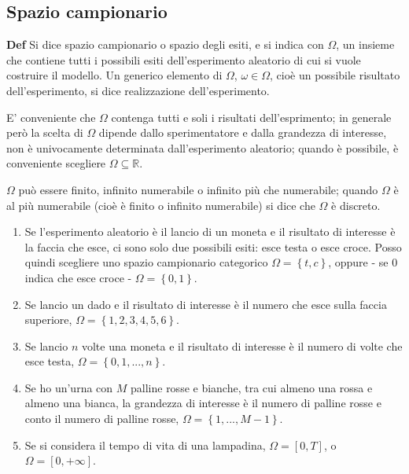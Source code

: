 \documentclass{article}
\begin{document}
\subsection{Spazio campionario}

\textbf{Def} Si dice spazio campionario o spazio degli esiti, e si indica
con $\Omega $, un insieme che contiene tutti i possibili esiti
dell'esperimento aleatorio di cui si vuole costruire il modello. Un generico
elemento di $\Omega $, $\omega \in \Omega $, cio\`{e} un possibile risultato
dell'esperimento, si dice realizzazione dell'esperimento.

E' conveniente che $\Omega $ contenga tutti e soli i risultati
dell'esprimento; in generale per\`{o} la scelta di $\Omega $ dipende dallo
sperimentatore e dalla grandezza di interesse, non \`{e} univocamente
determinata dall'esperimento aleatorio; quando \`{e} possibile, \`{e}
conveniente scegliere $\Omega \subseteq 
\mathbb{R}
$.

$\Omega $ pu\`{o} essere finito, infinito numerabile o infinito pi\`{u} che
numerabile; quando $\Omega $ \`{e} al pi\`{u} numerabile (cio\`{e} \`{e}
finito o infinito numerabile) si dice che $\Omega $ \`{e} discreto.

\begin{enumerate}
\item Se l'esperimento aleatorio \`{e} il lancio di un moneta e il risultato
di interesse \`{e} la faccia che esce, ci sono solo due possibili esiti:
esce testa o esce croce. Posso quindi scegliere uno spazio campionario
categorico $\Omega =\left\{ t,c\right\} $, oppure - se $0$ indica che esce
croce - $\Omega =\left\{ 0,1\right\} $.

\item Se lancio un dado e il risultato di interesse \`{e} il numero che esce
sulla faccia superiore, $\Omega =\left\{ 1,2,3,4,5,6\right\} $.

\item Se lancio $n$ volte una moneta e il risultato di interesse \`{e} il
numero di volte che esce testa, $\Omega =\left\{ 0,1,...,n\right\} $.

\item Se ho un'urna con $M$ palline rosse e bianche, tra cui almeno una
rossa e almeno una bianca, la grandezza di interesse \`{e} il numero di
palline rosse e conto il numero di palline rosse, $\Omega =\left\{
1,...,M-1\right\} $.

\item Se si considera il tempo di vita di una lampadina, $\Omega =\left[ 0,T%
\right] $, o $\Omega =\left[ 0,+\infty \right] $.
\end{enumerate}
\end{document}
